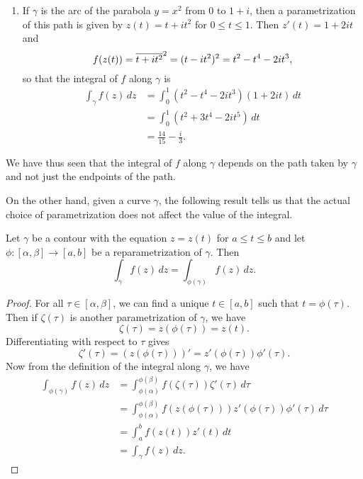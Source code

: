\begin{example}
\begin{enumerate}[label=(\alph*), wide, nosep]
        \item If \(\gamma\) is the arc of the parabola \(y = x^2\) from \(0\) to
        \(1 + i\), then a parametrization of this path is given by \(z(t) = t +
        it^2\) for \(0 \leq t \leq 1\). Then \(z'(t) = 1 + 2it\) and
        \[
            f(z(t)) = \overline{t + it^2}^2 = (t - it^2)^2 = t^2 - t^4 - 2it^3,
        \]
        so that the integral of \(f\) along \(\gamma\) is
        \[
            \begin{aligned}
                \int_\gamma f(z) \, dz &= \int_0^1 (t^2 - t^4 - 2it^3)(1 + 2it) \, dt \\
                &= \int_0^1 (t^2 + 3t^4 - 2it^5) \, dt \\
                &= \frac{14}{15} - \frac{i}{3}.
            \end{aligned}
        \]
    \end{enumerate}
    We have thus seen that the integral of \(f\) along \(\gamma\) depends on the
    path taken by \(\gamma\) and not just the endpoints of the path.
\end{example}

On the other hand, given a curve \(\gamma\), the following result tells us that
the actual choice of parametrization does not affect the value of the integral.

\begin{theorem}
    Let \(\gamma\) be a contour with the equation \(z = z(t)\) for \(a \leq t
    \leq b\) and let \(\phi: [\alpha, \beta] \to [a, b]\) be a reparametrization
    of \(\gamma\). Then
    \[
        \int_\gamma f(z) \, dz = \int_{\phi(\gamma)} f(z) \, dz.
    \]
\end{theorem}

\begin{proof}
    For all \(\tau \in [\alpha, \beta]\), we can find a unique \(t \in [a, b]\) such that \(t = \phi(\tau)\). Then if \(\zeta(\tau)\) is another parametrization of \(\gamma\), we have
    \[
        \zeta(\tau) = z(\phi(\tau)) = z(t).
    \]
    Differentiating with respect to \(\tau\) gives
    \[
        \zeta'(\tau) = \left( z(\phi(\tau)) \right)' = z'(\phi(\tau)) \phi'(\tau).
    \]
    Now from the definition of the integral along \(\gamma\), we have
    \begin{align*}
        \int_{\phi(\gamma)} f(z) \, dz &= \int_{\phi(\alpha)}^{\phi(\beta)} f(\zeta(\tau)) \zeta'(\tau) \, d\tau \\
        &= \int_{\phi(\alpha)}^{\phi(\beta)} f(z(\phi(\tau))) z'(\phi(\tau)) \phi'(\tau) \, d\tau \\
        &= \int_{a}^{b} f(z(t)) z'(t) \, dt\\
        &= \int_{\gamma} f(z) \, dz.
    \end{align*}
\end{proof}

